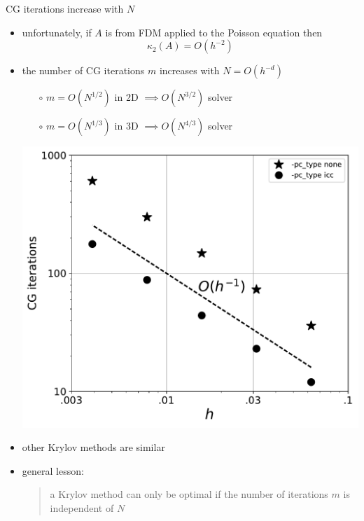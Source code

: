 \documentclass[hide notes,intlimits,usenames,dvipsnames]{beamer}
\begin{document}
\begin{frame}{CG iterations increase with $N$}

\begin{itemize}
\item unfortunately, if $A$ is from FDM applied to the Poisson equation then
    $$\kappa_2(A) = O(h^{-2})$$
\item \begin{minipage}[t]{55mm}
the number of CG iterations $m$ increases with $N=O(h^{-d})$
	\begin{itemize}
	\item[$\circ$] $m=O(N^{1/2})$ in 2D $\implies O(N^{3/2})$ solver
	\item[$\circ$] $m=O(N^{1/3})$ in 3D $\implies O(N^{4/3})$ solver
	\end{itemize}
\end{minipage} \quad
\begin{minipage}[t]{40mm}
\vspace{-2mm}

\includegraphics[width=\textwidth]{figs/poisson-cg-scale}
\end{minipage}

\vspace{-2mm}
\item other Krylov methods are similar

\vspace{5mm}
\item general lesson:

\begin{quote}
\alert{a Krylov method can only be optimal if the number of iterations $m$ is independent of $N$}
\end{quote}
\end{itemize}
\end{frame}
\end{document}
